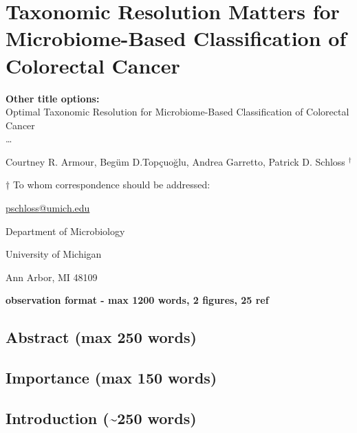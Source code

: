 \documentclass[
]{article}
\author{}
\date{\vspace{-2.5em}}
\begin{document}
\hypertarget{taxonomic-resolution-matters-for-microbiome-based-classification-of-colorectal-cancer}{%
\section{Taxonomic Resolution Matters for Microbiome-Based
Classification of Colorectal
Cancer}\label{taxonomic-resolution-matters-for-microbiome-based-classification-of-colorectal-cancer}}

\vspace{10mm}

\textbf{Other title options:}\\
Optimal Taxonomic Resolution for Microbiome-Based Classification of
Colorectal Cancer\\
\ldots{}

\vspace{10mm}

Courtney R. Armour, Begüm D.Topçuoğlu, Andrea Garretto, Patrick D.
Schloss \({^\dagger}\)

\vspace{20mm}

\({\dagger}\) To whom correspondence should be addressed:

\href{mailto:pschloss@umich.edu}{pschloss@umich.edu}

Department of Microbiology

University of Michigan

Ann Arbor, MI 48109

\vspace{20mm}

\textbf{observation format - max 1200 words, 2 figures, 25 ref}

\newpage

\hypertarget{abstract-max-250-words}{%
\subsection{Abstract (max 250 words)}\label{abstract-max-250-words}}

\hypertarget{importance-max-150-words}{%
\subsection{Importance (max 150 words)}\label{importance-max-150-words}}

\newpage

\hypertarget{introduction-250-words}{%
\subsection{Introduction (\textasciitilde250
words)}\label{introduction-250-words}}
\end{document}
